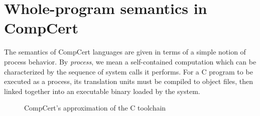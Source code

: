 \documentclass[11pt,oneside,draft]{book}
\theoremstyle{definition}
\begin{document}
\section{Whole-program semantics in CompCert} \label{sec:sem:closed} %


The semantics of CompCert languages
are given in terms of a simple notion of process behavior.
By \emph{process}, we mean a self-contained computation
which can be characterized by
the sequence of system calls it performs.
For a C program to be executed as a process,
its translation units must be compiled to object files,
then linked together
into an executable binary
loaded by the system.

\begin{figure} %
  \centering
    \caption{CompCert's approximation of the C toolchain}
    \label{fig:process}
\end{figure}
\end{document}
